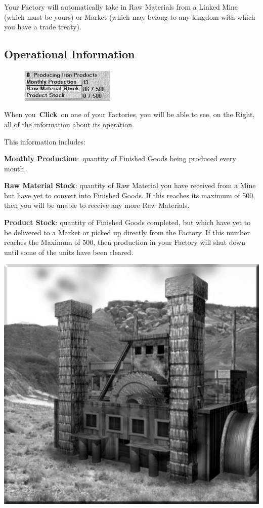 Your Factory will automatically take in Raw Materials from a Linked Mine (which must be yours) or Market (which may belong to any kingdom with which you have a trade treaty).

\subsection{Operational Information}

\begin{figure}
	\vspace{-20pt}
	\begin{center}
		\includegraphics[width=0.4\textwidth]{Ifactoryinfo}
	\end{center}
	\vspace{-20pt}
\end{figure}

When you \textbf{Click} on one of your Factories, you will be able to see, on the Right, all of the information about its operation.

This information includes:

\textbf{Monthly Production}: quantity of Finished Goods being produced every month.

\textbf{Raw Material Stock}: quantity of Raw Material you have received from a Mine but have yet to convert into Finished Goods. If this reaches its maximum of 500, then you will be unable to receive any more Raw Materials.

\textbf{Product Stock}: quantity of Finished Goods completed, but which have yet to be delivered to a Market or picked up directly from the Factory. If this number reaches the Maximum of 500, then production in your Factory will shut down until some of the units have been cleared.

\begin{center}
	\includegraphics[width=0.7\linewidth]{Afactory}
\end{center}

